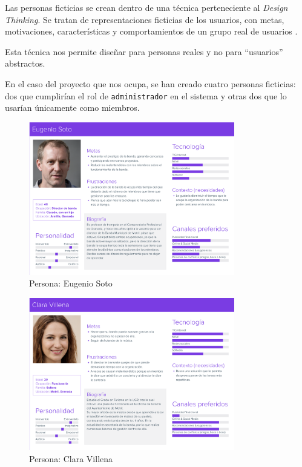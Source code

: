 Las personas ficticias se crean dentro de una técnica perteneciente al \textit{Design Thinking}. Se tratan de representaciones ficticias de los usuarios, con metas, motivaciones, características y comportamientos de un grupo real de usuarios \cite{personnas}.

Esta técnica nos permite diseñar para personas reales y no para ``usuarios'' abstractos.

En el caso del proyecto que nos ocupa, se han creado cuatro personas ficticias: dos que cumplirían el rol de \texttt{administrador} en el sistema y otras dos que lo usarían únicamente como miembros.

\begin{figure}[h]
\centering
\includegraphics[width=0.8\textwidth]{imagenes/personas/persona_eugenio.png}
\caption{Persona: Eugenio Soto}
\label{fig:persona_eugenio}
\end{figure}

\begin{figure}[h]
\centering
\includegraphics[width=0.8\textwidth]{imagenes/personas/persona_clara.png}
\caption{Persona: Clara Villena}
\label{fig:persona_clara}
\end{figure}


